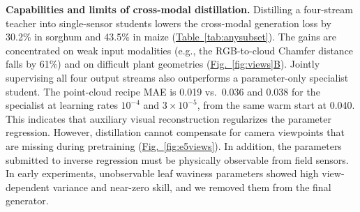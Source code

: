 \documentclass[10pt,twocolumn,letterpaper]{article}
\newcommand{\figref}[1]{\hyperref[#1]{Fig.~\ref*{#1}}}
\newcommand{\subfigref}[2]{\hyperref[#1]{Fig.~\ref*{#1}#2}} %
\newcommand{\tabref}[1]{\hyperref[#1]{Table~\ref*{#1}}}
\begin{document}
\noindent\textbf{Capabilities and limits of cross-modal distillation.}
Distilling a four-stream teacher into single-sensor students lowers the cross-modal generation loss by 30.2\% in sorghum and 43.5\% in maize (\tabref{tab:anysubset}). The gains are concentrated on weak input modalities (e.g., the RGB-to-cloud Chamfer distance falls by 61\%) and on difficult plant geometries (\subfigref{fig:views}{B}). Jointly supervising all four output streams also outperforms a parameter-only specialist student. The point-cloud recipe MAE is 0.019 vs.\ 0.036 and 0.038 for the specialist at learning rates $10^{-4}$ and $3 \times 10^{-5}$, from the same warm start at 0.040. This indicates that auxiliary visual reconstruction regularizes the parameter regression. However, distillation cannot compensate for camera viewpoints that are missing during pretraining (\figref{fig:e5views}). In addition, the parameters submitted to inverse regression must be physically observable from field sensors. In early experiments, unobservable leaf waviness parameters showed high view-dependent variance and near-zero skill, and we removed them from the final generator.
\end{document}

